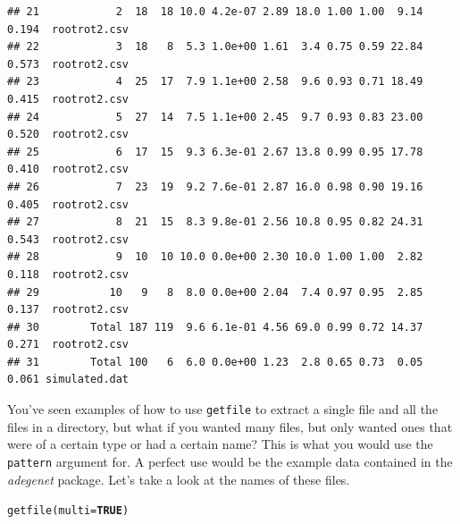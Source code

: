\documentclass[letterpaper]{article}\usepackage[]{graphicx}\usepackage[]{color}
\makeatletter
\newcommand{\hlnum}[1]{\textcolor[rgb]{0.502,0,0.502}{\textbf{#1}}}%
\newcommand{\hlstd}[1]{\textcolor[rgb]{0,0,0}{#1}}%
\newcommand{\hlkwc}[1]{\textcolor[rgb]{0,0.502,0.753}{#1}}%
\newcommand{\hlkwd}[1]{\textcolor[rgb]{0,0.267,0.4}{#1}}%
\newenvironment{kframe}{%
 \def\at@end@of@kframe{}%
 \ifinner\ifhmode%
  \def\at@end@of@kframe{\end{minipage}}%
  \begin{minipage}{\columnwidth}%
 \fi\fi%
 \def\FrameCommand##1{\hskip\@totalleftmargin \hskip-\fboxsep
 \colorbox{shadecolor}{##1}\hskip-\fboxsep
     \hskip-\linewidth \hskip-\@totalleftmargin \hskip\columnwidth}%
 \MakeFramed {\advance\hsize-\width
   \@totalleftmargin\z@ \linewidth\hsize
   \@setminipage}}%
 {\par\unskip\endMakeFramed%
 \at@end@of@kframe}
\newenvironment{knitrout}{}{} %
\makeatother
\begin{document}
\begin{knitrout}
\begin{kframe}
\begin{verbatim}
## 21            2  18  18 10.0 4.2e-07 2.89 18.0 1.00 1.00  9.14 0.194  rootrot2.csv
## 22            3  18   8  5.3 1.0e+00 1.61  3.4 0.75 0.59 22.84 0.573  rootrot2.csv
## 23            4  25  17  7.9 1.1e+00 2.58  9.6 0.93 0.71 18.49 0.415  rootrot2.csv
## 24            5  27  14  7.5 1.1e+00 2.45  9.7 0.93 0.83 23.00 0.520  rootrot2.csv
## 25            6  17  15  9.3 6.3e-01 2.67 13.8 0.99 0.95 17.78 0.410  rootrot2.csv
## 26            7  23  19  9.2 7.6e-01 2.87 16.0 0.98 0.90 19.16 0.405  rootrot2.csv
## 27            8  21  15  8.3 9.8e-01 2.56 10.8 0.95 0.82 24.31 0.543  rootrot2.csv
## 28            9  10  10 10.0 0.0e+00 2.30 10.0 1.00 1.00  2.82 0.118  rootrot2.csv
## 29           10   9   8  8.0 0.0e+00 2.04  7.4 0.97 0.95  2.85 0.137  rootrot2.csv
## 30        Total 187 119  9.6 6.1e-01 4.56 69.0 0.99 0.72 14.37 0.271  rootrot2.csv
## 31        Total 100   6  6.0 0.0e+00 1.23  2.8 0.65 0.73  0.05 0.061 simulated.dat
\end{verbatim}
\end{kframe}
\end{knitrout}


You've seen examples of how to use \texttt{getfile} to extract a single file and all the files in a directory, but what if you wanted many files, but only wanted ones that were of a certain type or had a certain name? This is what you would use the \texttt{pattern} argument for.
A perfect use would be the example data contained in the \textit{adegenet} package. Let's take a look at the names of these files.
\begin{center}
\end{center}
\begin{knitrout}\footnotesize
{}\color{fgcolor}\begin{kframe}
\begin{alltt}
\hlkwd{getfile}\hlstd{(}\hlkwc{multi} \hlstd{=} \hlnum{TRUE}\hlstd{)}
\end{alltt}
\end{kframe}
\end{knitrout}
\end{document}
